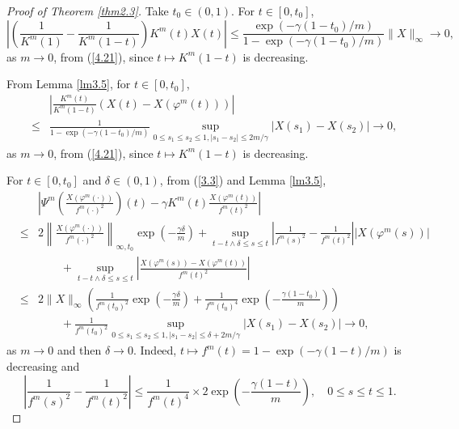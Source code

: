 \documentclass[12pt]{article}
\begin{document}
\begin{proof}[Proof of Theorem \ref{thm2.3}]
Take $t_0\in (0,1)$. For $t\in [0, t_0]$,
\begin{equation}%
\left|\left(\frac{1}{K^m(1)}-\frac{1}{K^m(1-t)}\right)K^m(t)X(t)\right|
\le \frac{\exp(-\gamma(1-t_0)/m)}{1-\exp(-\gamma(1-t_0)/m)}\|X\|_\infty\to 0,
\end{equation}
as $m\to 0$,  from (\ref{4.21}), since $t\mapsto K^m(1-t)$ is decreasing.

From Lemma \ref{lm3.5}, 
 for $t\in [0, t_0]$,
\begin{eqnarray}%
&&\left|\frac{K^m(t)}{K^m(1-t)}(X(t)-X(\varphi^m(t)))\right|\\
& \le& \frac{1}{1-\exp(-\gamma(1-t_0)/m)}\sup_{0\le s_1\le s_2\le 1, |s_1-s_2|\le 2m/\gamma}|X(s_1)-X(s_2)|\to 0, \nonumber
\end{eqnarray}
as $m\to 0$, from (\ref{4.21}), since $t\mapsto K^m(1-t)$ is decreasing.

For $t\in [0, t_0]$ and $\delta\in (0,1)$, from (\ref{3.3}) and Lemma \ref{lm3.5},
\begin{eqnarray}
&&\left|\Psi^m\left(\frac{X(\varphi^m(\cdot))}{f^m(\cdot)^2}\right)(t)
-\gamma K^m(t)\frac{X(\varphi^m(t))}{f^m(t)^2}\right|\label{3.34}\\
& \le& 2\left\|\frac{X(\varphi^m(\cdot))}{f^m(\cdot)^2}\right\|_{\infty,t_0}\exp\left (-\frac{\gamma\delta}{m} \right)
+\sup_{t-t\wedge\delta\le s\le t}\left|\frac{1}{f^m(s)^2}-\frac{1}{f^m(t)^2}\right|
| X(\varphi^m(s))|\nonumber\\
&&\qquad +\sup_{t-t\wedge\delta\le s\le t}\left|\frac{X(\varphi^m(s))-X(\varphi^m(t))}{f^m(t)^2}\right|\nonumber\\
& \le& 2\|X\|_\infty\left(\frac{1}{f^m(t_0)^2}\exp\left (-\frac{\gamma\delta}{m} \right)
+\frac{1}{f^m(t_0)^4}\exp\left(-\frac{\gamma(1-t_0)}{m}\right)\right)\nonumber\\
&&\qquad +\frac{1}{f^m(t_0)^2}\sup_{0\le s_1\le s_2\le 1, |s_1-s_2|\le \delta+2m/\gamma}
|X(s_1)-X(s_2)|\to 0,\nonumber
\end{eqnarray}
as $m\to 0$ and then $\delta\to 0$.
Indeed,  $t\mapsto f^m (t)=1-\exp (-\gamma (1-t)/m)$ is decreasing and 
$$\left|\frac{1}{f^m(s)^2}-\frac{1}{f^m(t)^2}\right|\le \frac{1}{f^m(t)^4}\times 2\exp\left(-\frac{\gamma (1-t)}{m}\right),\quad 0\le s\le t\le 1.$$




\end{proof}
\end{document}
